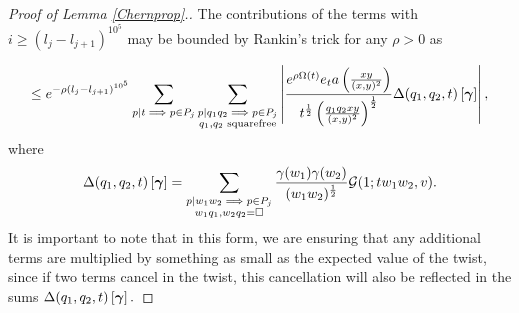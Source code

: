 \documentclass[12pt]{amsart}
\numberwithin{equation}{section}
\numberwithin{thm}{section}
\newcommand{\1}{\mathbf 1}
\begin{document}
\begin{proof}[Proof of Lemma \ref{Chernprop}.]
	The contributions of the terms with $i\ge (l_j-l_{j+1})^{10^5}$ may be bounded by Rankin's trick for any $\rho>0$ 
	as
	

	\begin{equation}\label{Rankin1}\begin{split}
			\le e^{- \rho(l_j-l_{j+1})^{10^5}} \sum_{p|t\implies p\in P_j}\sum_{\substack{p|q_1q_2\implies p\in P_{j}\\ q_1,q_2\text{  squarefree}}} \left|\frac{e^{\rho \Omega(t)} e_ta\left(\frac{xy}{(x,y)^2}\right)}{t^{\frac{1}{2}}\left(\frac{q_1q_2xy}{(x,y)^2}\right)^{\frac{1}{2}}} \Delta(q_1,q_2,t)\left[\mbox{\boldmath$\gamma$}\right]\right|, 
		\end{split}
	\end{equation}
	where \begin{equation}\Delta(q_1,q_2,t)\left[\mbox{\boldmath$\gamma$}\right]=  \sum_{\substack{p|w_1w_2\implies p\in P_{j}\\ w_1q_1,w_2q_2=\square}}\frac{\gamma(w_1)\gamma(w_2)}{(w_1w_2)^{\frac{1}{2}}} \mathcal{G}(1;tw_1w_2,v).
	\end{equation}
	It is important to note that in this form, we are ensuring that any additional terms are multiplied by something as small as the expected value of the twist, since if two terms cancel in the twist, this cancellation will also be reflected in the sums $\Delta(q_1,q_2,t)\left[\mbox{\boldmath$\gamma$}\right].$
	

\end{proof}
\end{document}
